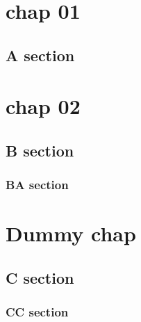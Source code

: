 \documentclass{book}
\begin{document}
\tableofcontents

\clearpage

\chapter{chap 01}
\section{A section}
\lipsum

\chapter{chap 02}
\section{B section}
\subsection{BA section}
\lipsum

\setcounter{chapter}{100}
\chapter{Dummy chap}
\section{C section}
\subsection{CC section}
\lipsum
\end{document}
